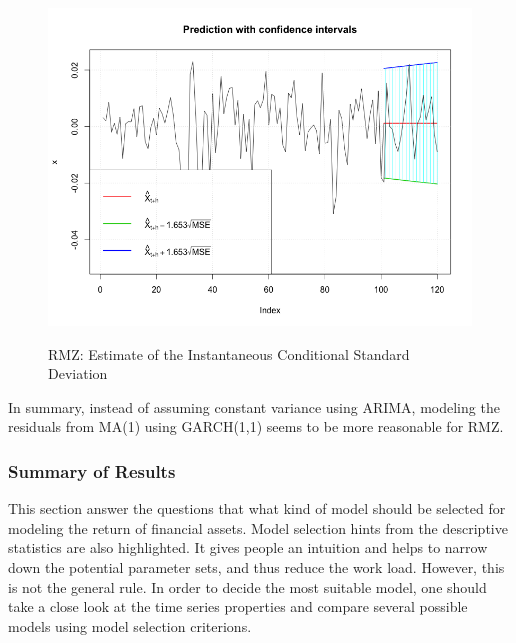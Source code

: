 \documentclass[12pt]{article}
\begin{document}
\begin{figure}
  \caption{RMZ: Estimate of the Instantaneous Conditional Standard Deviation}
  \includegraphics[width = \textwidth]{../results/RMZ_GARCH_predCI}
  \label{fig:RMZ_GARCH_predCI}
\end{figure}

In summary, instead of assuming constant variance using ARIMA, modeling the residuals from MA(1) using GARCH(1,1) seems to be more reasonable for RMZ.

\subsubsection{Summary of Results}
This section answer the questions that what kind of model should be selected for modeling the return of financial assets. Model selection hints from the descriptive statistics are also highlighted. It gives people an intuition and helps to narrow down the potential parameter sets, and thus reduce the work load. However, this is not the general rule. In order to decide the most suitable model, one should take a close look at the time series properties and compare several possible models using model selection criterions.
\end{document}
